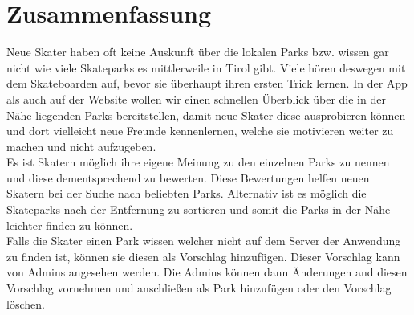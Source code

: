 \section*{Zusammenfassung}

Neue Skater haben oft keine Auskunft über die lokalen Parks bzw. wissen gar nicht wie viele
Skateparks es mittlerweile in Tirol gibt. Viele hören deswegen mit dem Skateboarden auf, bevor sie 
überhaupt ihren ersten Trick lernen. In der App als auch auf der Website wollen wir einen 
schnellen Überblick über die in der Nähe liegenden Parks bereitstellen, damit neue Skater diese
ausprobieren können und dort vielleicht neue Freunde kennenlernen, welche sie motivieren weiter zu 
machen und nicht aufzugeben.\\


Es ist Skatern möglich ihre eigene Meinung zu den einzelnen Parks zu nennen und diese dementsprechend 
zu bewerten. Diese Bewertungen helfen neuen Skatern bei der Suche nach beliebten Parks. 
Alternativ ist es möglich die Skateparks nach der Entfernung zu sortieren und somit die Parks in 
der Nähe leichter finden zu können. \\


Falls die Skater einen Park wissen welcher nicht auf dem Server der Anwendung zu finden ist, können 
sie diesen als Vorschlag hinzufügen. Dieser Vorschlag kann von Admins angesehen werden. Die Admins 
können dann Änderungen and diesen Vorschlag vornehmen und anschließen als Park hinzufügen oder den
Vorschlag löschen.\\
\newpage